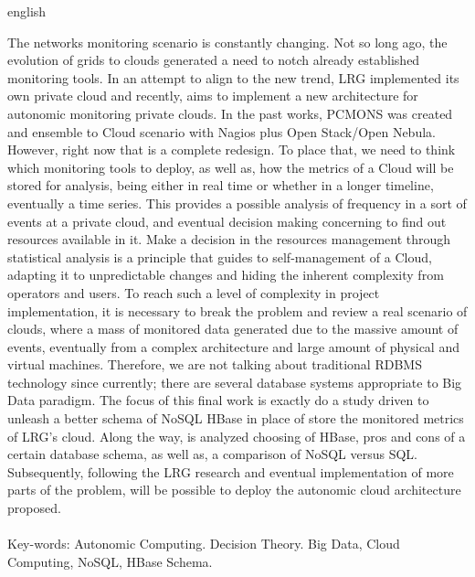\begin{resumo}[Abstract]
\begin{otherlanguage*}{english}

The networks monitoring scenario is constantly changing. Not so long ago, the
evolution of grids to clouds generated a need to notch already established
monitoring tools. In an attempt to align to the new trend, LRG implemented its
own private cloud and recently, aims to implement a new architecture for
autonomic monitoring private clouds. In the past works, PCMONS was created and
ensemble to Cloud scenario with Nagios plus Open Stack/Open Nebula. However,
right now that is a complete redesign. To place that, we need to think which
monitoring tools to deploy, as well as, how the metrics of a Cloud will be
stored for analysis, being either in real time or whether in a longer timeline,
eventually a time series. This provides a possible analysis of frequency in a
sort of events at a private cloud, and eventual decision making concerning to
find out resources available in it. Make a decision in the resources management
through statistical analysis is a principle that guides to self-management of a
Cloud, adapting it to unpredictable changes and hiding the inherent complexity
from operators and users. To reach such a level of complexity in project
implementation, it is necessary to break the problem and review a real scenario
of clouds, where a mass of monitored data generated due to the massive amount of
events, eventually from a complex architecture and large amount of physical and
virtual machines. Therefore, we are not talking about traditional RDBMS
technology since currently; there are several database systems appropriate to
Big Data paradigm. The focus of this final work is exactly do a study driven to
unleash a better schema of NoSQL HBase in place of store the monitored metrics
of LRG’s cloud. Along the way, is analyzed choosing of HBase, pros and cons of a
certain database schema, as well as, a comparison of NoSQL versus SQL.
Subsequently, following the LRG research and eventual implementation of more
parts of the problem, will be possible to deploy the autonomic cloud
architecture proposed. 
\\\\
\noindent
Key-words: Autonomic Computing. Decision Theory. Big Data, Cloud Computing,
NoSQL, HBase Schema.

\end{otherlanguage*}
\end{resumo}